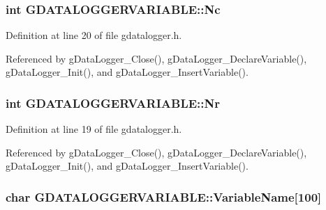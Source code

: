 \hypertarget{structGDATALOGGERVARIABLE_abd1db7599f09e121cd125e665cb9c460}{
\subsubsection[{Nc}]{\setlength{\rightskip}{0pt plus 5cm}int G\-D\-A\-T\-A\-L\-O\-G\-G\-E\-R\-V\-A\-R\-I\-A\-B\-L\-E\-::\-Nc}}\label{structGDATALOGGERVARIABLE_abd1db7599f09e121cd125e665cb9c460}


Definition at line 20 of file gdatalogger.\-h.



Referenced by g\-Data\-Logger\-\_\-\-Close(), g\-Data\-Logger\-\_\-\-Declare\-Variable(), g\-Data\-Logger\-\_\-\-Init(), and g\-Data\-Logger\-\_\-\-Insert\-Variable().

\hypertarget{structGDATALOGGERVARIABLE_a68c3eb0f57a786afe9a2658fc42b61d6}{
\subsubsection[{Nr}]{\setlength{\rightskip}{0pt plus 5cm}int G\-D\-A\-T\-A\-L\-O\-G\-G\-E\-R\-V\-A\-R\-I\-A\-B\-L\-E\-::\-Nr}}\label{structGDATALOGGERVARIABLE_a68c3eb0f57a786afe9a2658fc42b61d6}


Definition at line 19 of file gdatalogger.\-h.



Referenced by g\-Data\-Logger\-\_\-\-Close(), g\-Data\-Logger\-\_\-\-Declare\-Variable(), g\-Data\-Logger\-\_\-\-Init(), and g\-Data\-Logger\-\_\-\-Insert\-Variable().

\hypertarget{structGDATALOGGERVARIABLE_a336b7b6cbfc9cdebc7e1ade3de17ac3f}{
\subsubsection[{Variable\-Name}]{\setlength{\rightskip}{0pt plus 5cm}char G\-D\-A\-T\-A\-L\-O\-G\-G\-E\-R\-V\-A\-R\-I\-A\-B\-L\-E\-::\-Variable\-Name\mbox{[}100\mbox{]}}}\label{structGDATALOGGERVARIABLE_a336b7b6cbfc9cdebc7e1ade3de17ac3f}


